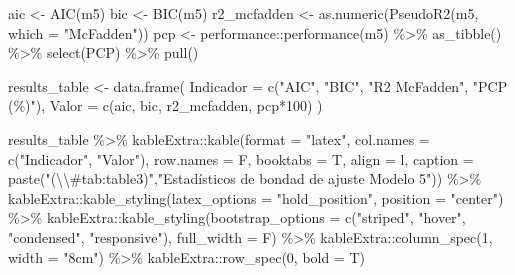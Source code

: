 \documentclass[
  12pt,
  a4paper,
]{article}
\newenvironment{Shaded}{\begin{snugshade}}{\end{snugshade}}
\newcommand{\AttributeTok}[1]{\textcolor[rgb]{0.77,0.63,0.00}{#1}}
\newcommand{\DecValTok}[1]{\textcolor[rgb]{0.00,0.00,0.81}{#1}}
\newcommand{\FunctionTok}[1]{\textcolor[rgb]{0.00,0.00,0.00}{#1}}
\newcommand{\NormalTok}[1]{#1}
\newcommand{\OtherTok}[1]{\textcolor[rgb]{0.56,0.35,0.01}{#1}}
\newcommand{\SpecialCharTok}[1]{\textcolor[rgb]{0.00,0.00,0.00}{#1}}
\newcommand{\StringTok}[1]{\textcolor[rgb]{0.31,0.60,0.02}{#1}}
\begin{document}
\begin{Shaded}
\begin{Highlighting}[]
\NormalTok{aic }\OtherTok{\textless{}{-}} \FunctionTok{AIC}\NormalTok{(m5)}
\NormalTok{bic }\OtherTok{\textless{}{-}} \FunctionTok{BIC}\NormalTok{(m5)}
\NormalTok{r2\_mcfadden }\OtherTok{\textless{}{-}} \FunctionTok{as.numeric}\NormalTok{(}\FunctionTok{PseudoR2}\NormalTok{(m5, }\AttributeTok{which =} \StringTok{"McFadden"}\NormalTok{))}
\NormalTok{pcp }\OtherTok{\textless{}{-}}\NormalTok{ performance}\SpecialCharTok{::}\FunctionTok{performance}\NormalTok{(m5)  }\SpecialCharTok{\%\textgreater{}\%} 
  \FunctionTok{as\_tibble}\NormalTok{() }\SpecialCharTok{\%\textgreater{}\%} 
  \FunctionTok{select}\NormalTok{(PCP) }\SpecialCharTok{\%\textgreater{}\%} 
  \FunctionTok{pull}\NormalTok{()}
  

\NormalTok{results\_table }\OtherTok{\textless{}{-}} \FunctionTok{data.frame}\NormalTok{(}
  \AttributeTok{Indicador =} \FunctionTok{c}\NormalTok{(}\StringTok{"AIC"}\NormalTok{, }\StringTok{"BIC"}\NormalTok{, }\StringTok{"R2 McFadden"}\NormalTok{, }\StringTok{"PCP (\%)"}\NormalTok{),}
  \AttributeTok{Valor =} \FunctionTok{c}\NormalTok{(aic, bic, r2\_mcfadden, pcp}\SpecialCharTok{*}\DecValTok{100}\NormalTok{)}
\NormalTok{)}

\NormalTok{results\_table }\SpecialCharTok{\%\textgreater{}\%} 
\NormalTok{ kableExtra}\SpecialCharTok{::}\FunctionTok{kable}\NormalTok{(}\AttributeTok{format =} \StringTok{"latex"}\NormalTok{, }
                    \AttributeTok{col.names =} \FunctionTok{c}\NormalTok{(}\StringTok{"Indicador"}\NormalTok{, }\StringTok{"Valor"}\NormalTok{),}
                    \AttributeTok{row.names =}\NormalTok{ F,}
                    \AttributeTok{booktabs =}\NormalTok{ T, }\AttributeTok{align =} \StringTok{\textquotesingle{}l\textquotesingle{}}\NormalTok{,}
                    \AttributeTok{caption =} \FunctionTok{paste}\NormalTok{(}\StringTok{"(}\SpecialCharTok{\textbackslash{}\textbackslash{}}\StringTok{\#tab:table3)"}\NormalTok{,}\StringTok{"Estadísticos de bondad de ajuste Modelo 5"}\NormalTok{)) }\SpecialCharTok{\%\textgreater{}\%} 
\NormalTok{  kableExtra}\SpecialCharTok{::}\FunctionTok{kable\_styling}\NormalTok{(}\AttributeTok{latex\_options =} \StringTok{"hold\_position"}\NormalTok{, }
                            \AttributeTok{position =} \StringTok{"center"}\NormalTok{) }\SpecialCharTok{\%\textgreater{}\%}
\NormalTok{  kableExtra}\SpecialCharTok{::}\FunctionTok{kable\_styling}\NormalTok{(}\AttributeTok{bootstrap\_options =} \FunctionTok{c}\NormalTok{(}\StringTok{"striped"}\NormalTok{, }\StringTok{"hover"}\NormalTok{, }\StringTok{"condensed"}\NormalTok{, }\StringTok{"responsive"}\NormalTok{), }\AttributeTok{full\_width =}\NormalTok{ F) }\SpecialCharTok{\%\textgreater{}\%} 
\NormalTok{  kableExtra}\SpecialCharTok{::}\FunctionTok{column\_spec}\NormalTok{(}\DecValTok{1}\NormalTok{, }\AttributeTok{width =} \StringTok{"8cm"}\NormalTok{) }\SpecialCharTok{\%\textgreater{}\%}
\NormalTok{  kableExtra}\SpecialCharTok{::}\FunctionTok{row\_spec}\NormalTok{(}\DecValTok{0}\NormalTok{, }\AttributeTok{bold =}\NormalTok{ T)}



\end{Highlighting}
\end{Shaded}
\end{document}
